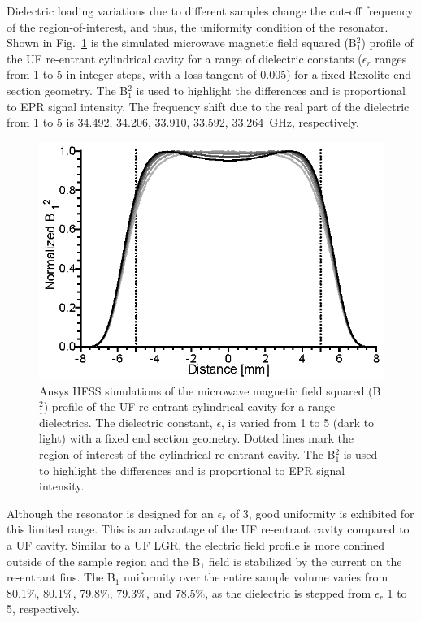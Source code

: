 Dielectric loading variations due to different samples change the cut-off frequency of the region-of-interest, and thus, the uniformity condition of the resonator. Shown in Fig.~\ref{Ch2-fig:dielectric} is the simulated microwave magnetic field squared (B$^2_1$) profile of the UF re-entrant cylindrical \cylTE{} cavity for a range of dielectric constants ($\epsilon_r$ ranges from 1 to 5 in integer steps, with a loss tangent of 0.005) for a fixed Rexolite end section geometry. The B$^2_1$ is used to highlight the differences and is proportional to EPR signal intensity. The frequency shift due to the real part of the dielectric from 1 to 5 is 34.492, 34.206, 33.910, 33.592, 33.264~GHz, respectively. 

\begin{figure}[htp]\centering
 \includegraphics{Kapitel/Ch2-Images/07-TE01Udielectirc.eps}
 \caption[Ansys HFSS simulations of with varying samples.]{Ansys HFSS simulations of the microwave magnetic field squared (B$^2_1$) profile of the UF re-entrant cylindrical \cylTE{} cavity for a range dielectrics. The dielectric constant, $\epsilon$, is varied from 1 to 5 (dark to light) with a fixed end section geometry. Dotted lines mark the region-of-interest of the cylindrical re-entrant \cylTE{} cavity.  The B$^2_1$ is used to highlight the differences and is proportional to EPR signal intensity. }
 \label{Ch2-fig:dielectric}
\end{figure}

Although the resonator is designed for an $\epsilon_r$ of 3, good uniformity is exhibited for this limited range. This is an advantage of the UF re-entrant cavity compared to a UF cavity. Similar to a UF LGR, the electric field profile is more confined outside of the sample region and the B$_1$ field is stabilized by the current on the re-entrant fins. The B$_1$ uniformity over the entire sample volume varies from 80.1\%, 80.1\%, 79.8\%, 79.3\%, and	78.5\%, as the dielectric is stepped from $\epsilon_r$ 1 to 5, respectively.

